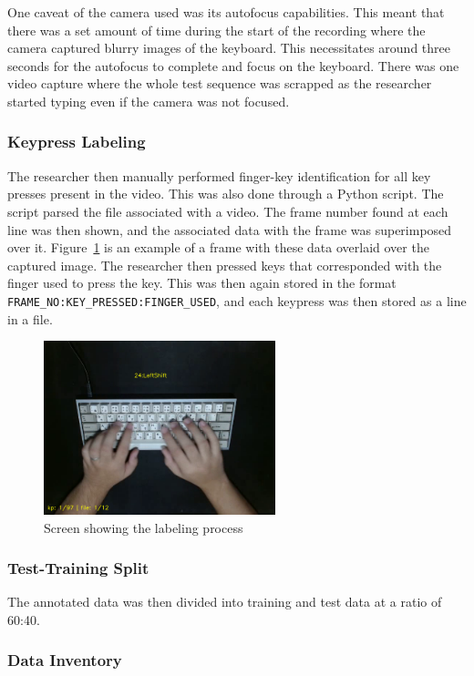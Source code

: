 \documentclass{report}
\begin{document}
One caveat of the camera used was its autofocus capabilities. This meant that
there was a set amount of time during the start of the recording where the
camera captured blurry images of the keyboard. This necessitates around three
seconds for the autofocus to complete and focus on the keyboard. There was one
video capture where the whole test sequence was scrapped as the researcher
started typing even if the camera was not focused.

\subsubsection{Keypress Labeling}
The researcher then manually performed finger-key identification for all key
presses present in the video. This was also done through a Python script. The
script parsed the file associated with a video. The frame number found at each
line was then shown, and the associated data with the frame was superimposed
over it. Figure~\ref{fig:metho-data-process} is an example of a frame with these
data overlaid over the captured image. The researcher then pressed keys that
corresponded with the finger used to press the key. This was then again stored
in the format \texttt{FRAME\_NO:KEY\_PRESSED:FINGER\_USED}, and each keypress
was then stored as a line in a file.

\begin{figure}[H]
	\centering
	\includegraphics[width=0.6\textwidth]{labeling.png}
	\caption{Screen showing the labeling process}
	\label{fig:metho-data-process}
	\centering
\end{figure}


\subsubsection{Test-Training Split}
The annotated data was then divided into training and test data at a ratio of
60:40.

\subsubsection{Data Inventory}
\end{document}
